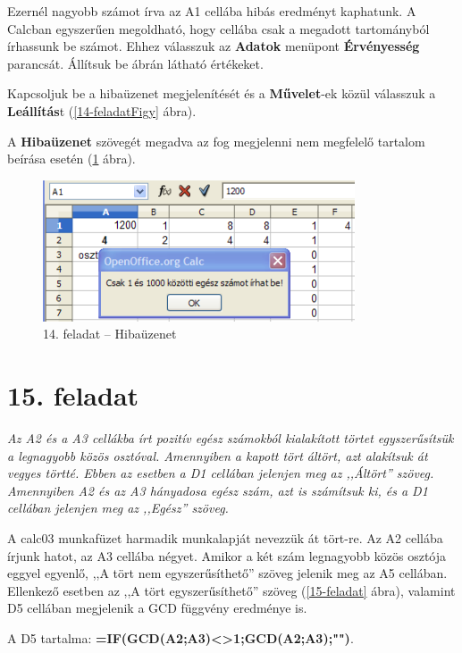 Ezernél nagyobb számot írva az A1 cellába hibás eredményt
kaphatunk. A Calcban egyszerűen megoldható, hogy cellába csak a
megadott tartományból írhassunk be számot. Ehhez válasszuk az
\textbf{Adatok} menüpont \textbf{Érvényesség} parancsát.
Állítsuk be  ábrán látható értékeket.

Kapcsoljuk be a hibaüzenet megjelenítését és a
\textbf{Művelet}-ek közül válasszuk a
\textbf{Leállítás}t (\ref{14-feladatFigy} ábra).  

A \textbf{Hibaüzenet} szövegét megadva az fog megjelenni nem
megfelelő tartalom beírása esetén (\ref{14-feladatHiba} ábra).

\begin{figure}[!h]
\begin{center}
\includegraphics[width=9.238cm]{oocalcv1-img83.png}
\caption{14.  feladat -- Hibaüzenet}\label{14-feladatHiba}
\end{center}
\end{figure}


\section{15. feladat}
{\itshape
Az A2 és a A3 cellákba írt pozitív egész számokból
kialakított törtet egyszerűsítsük a legnagyobb közös
osztóval. Amennyiben a kapott tört áltört, azt alakítsuk át
vegyes törtté. Ebben az esetben a D1 cellában jelenjen meg az
,,Áltört'' szöveg. Amennyiben A2
és az A3 hányadosa egész szám, azt is számítsuk ki, és a
D1 cellában jelenjen meg az
,,Egész'' szöveg.}

A calc03 munkafüzet harmadik munkalapját nevezzük át tört-re.
Az A2 cellába írjunk hatot, az A3  cellába négyet. Amikor a
két szám legnagyobb közös osztója eggyel egyenlő,
,,A tört nem
egyszerűsíthető'' szöveg jelenik meg az
A5 cellában. Ellenkező esetben az ,,A tört
egyszerűsíthető'' szöveg (\ref{15-feladat} ábra),
valamint D5 cellában megjelenik a GCD függvény eredménye is.

A D5 tartalma:
{\sffamily\bfseries{=IF(GCD(A2;A3)<>1;GCD(A2;A3);"")}}.

